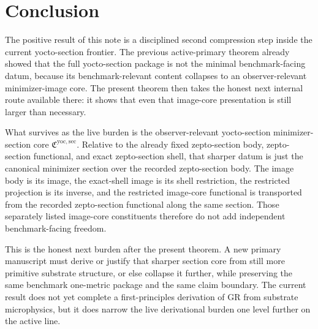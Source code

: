 \documentclass[11pt]{article}
\newcommand{\YoctoMinSectionCore}{\mathfrak C^{\mathrm{yoc,sec}}}
\begin{document}
\section{Conclusion}

The positive result of this note is a disciplined second compression step inside the current yocto-section frontier. The previous active-primary theorem already showed that the full yocto-section package is not the minimal benchmark-facing datum, because its benchmark-relevant content collapses to an observer-relevant minimizer-image core. The present theorem then takes the honest next internal route available there: it shows that even that image-core presentation is still larger than necessary.

What survives as the live burden is the observer-relevant yocto-section minimizer-section core \(\YoctoMinSectionCore\). Relative to the already fixed zepto-section body, zepto-section functional, and exact zepto-section shell, that sharper datum is just the canonical minimizer section over the recorded zepto-section body. The image body is its image, the exact-shell image is its shell restriction, the restricted projection is its inverse, and the restricted image-core functional is transported from the recorded zepto-section functional along the same section. Those separately listed image-core constituents therefore do not add independent benchmark-facing freedom.

This is the honest next burden after the present theorem. A new primary manuscript must derive or justify that sharper section core from still more primitive substrate structure, or else collapse it further, while preserving the same benchmark one-metric package and the same claim boundary. The current result does not yet complete a first-principles derivation of GR from substrate microphysics, but it does narrow the live derivational burden one level further on the active line.
\end{document}

